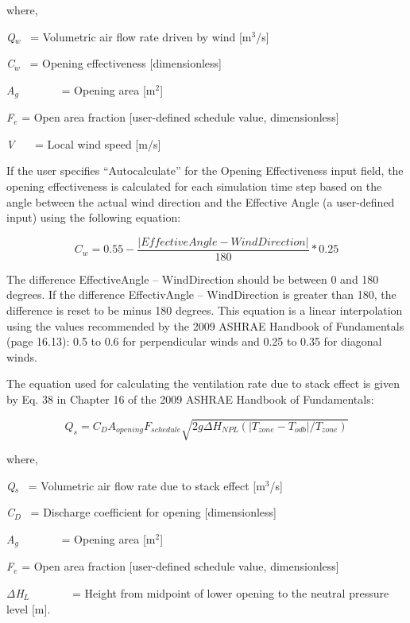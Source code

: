 where,

\emph{Q\(_{w}\)}~ = Volumetric air flow rate driven by wind {[}m\(^{3}\)/s{]}

\emph{C\(_{w}\)}~ = Opening effectiveness {[}dimensionless{]}

\emph{A\(_{g}\)}~~~~~~~ = Opening area {[}m\(^{2}\){]}

\emph{F\(_{e}\)} = Open area fraction {[}user-defined schedule value, dimensionless{]}

\emph{V}~~~ = Local wind speed {[}m/s{]}

If the user specifies ``Autocalculate'' for the Opening Effectiveness input field, the opening effectiveness is calculated for each simulation time step based on the angle between the actual wind direction and the Effective Angle (a user-defined input) using the following equation:

\begin{equation}
{C_w} = 0.55 - \frac{{\left| {EffectiveAngle - WindDirection} \right|}}{{180}}*0.25
\end{equation}

The difference \textbar{}EffectiveAngle -- WindDirection\textbar{} should be between 0 and 180 degrees. If the difference \textbar{}EffectivAngle -- WindDirection\textbar{} is greater than 180, the difference is reset to be minus 180 degrees. This equation is a linear interpolation using the values recommended by the 2009 ASHRAE Handbook of Fundamentals (page 16.13): 0.5 to 0.6 for perpendicular winds and 0.25 to 0.35 for diagonal winds.

The equation used for calculating the ventilation rate due to stack effect is given by Eq. 38 in Chapter 16 of the 2009 ASHRAE Handbook of Fundamentals:

\begin{equation}
{Q_s} = {C_D}{A_{opening}}{F_{schedule}}\sqrt {2g\Delta {H_{NPL}}(|{T_{zone}} - {T_{odb}}|/{T_{zone}})}
\end{equation}

where,

\emph{Q\(_{s}\)}~ = Volumetric air flow rate due to stack effect {[}m\(^{3}\)/s{]}

\emph{C\(_{D}\)}~ = Discharge coefficient for opening {[}dimensionless{]}

\emph{A\(_{g}\)}~~~~~~~ = Opening area {[}m\(^{2}\){]}

\emph{F\(_{e}\)} = Open area fraction {[}user-defined schedule value, dimensionless{]}

\emph{ΔH\(_{L}\)}~~~~~~~ = Height from midpoint of lower opening to the neutral pressure level {[}m{]}.

